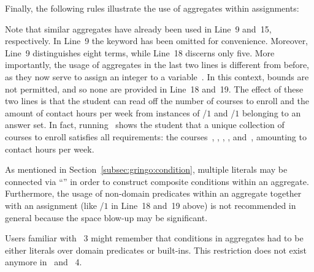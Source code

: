 \begin{example}
Finally, the following rules illustrate the use of aggregates within assignments:
%

%
Note that similar aggregates have already been used in Line~9 and~15, respectively.
In Line~9 the keyword  has been omitted for convenience.
Moreover, Line~9 distinguishes eight terms, while Line~18 discerns only five.
More importantly, the usage of aggregates in the last two lines is different from before,
as they now serve to assign an integer to a variable~.
In this context, bounds are not permitted, and so none are provided in Line~18 and~19.
The effect of these two lines is that the student can read off the number of
courses to enroll and the amount of contact hours per week from instances of
/$1$ and /$1$ belonging to an answer set.%
%
In fact, running \clasp\ shows the student that a unique
collection of~ courses to enroll satisfies all requirements:
the courses~, , , , and~,
amounting to~ contact hours per week.

As mentioned in Section~\ref{subsec:gringo:condition},
multiple literals may be connected via ``\code{,}'' in order to construct
composite conditions within an aggregate.
Furthermore, the usage of non-domain predicates within an aggregate
together with an assignment (like /$1$ in Line~18 and~19 above)
is not recommended in general because the space blow-up may be significant.
\eexample
\end{example}

\begin{note}
Users familiar with \gringo~3 might remember that conditions in aggregates
had to be either literals over domain predicates or built-ins.
This restriction does not exist anymore in \gringo\ and \clingo~4.
\end{note}

